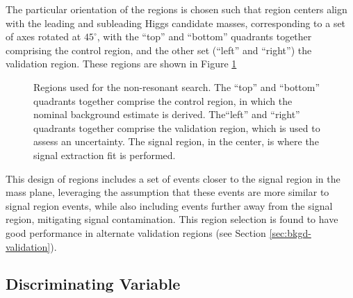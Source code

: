 The particular orientation of the regions is chosen such that region centers align with the leading
and subleading Higgs candidate masses, corresponding to a set of axes rotated at $45^{\circ}$, with the ``top''
and ``bottom'' quadrants together comprising the control region, and the other set (``left'' and ``right'')
the validation region. These regions are shown in Figure \ref{fig:nonres-regions}
\begin{figure}
\centering
{}
\caption{\label{fig:nonres-regions} Regions used for the non-resonant search. The ``top''
and ``bottom'' quadrants together comprise the control region, in which the nominal background 
estimate is derived. The``left'' and ``right'' quadrants together comprise the validation region, 
which is used to assess an uncertainty. The signal region, in the center, is where the signal extraction 
fit is performed.}
\end{figure}

This design of regions includes a set of events closer to the signal region in the mass plane, leveraging
the assumption that these events are more similar to signal region events, while also including events further away
from the signal region, mitigating signal contamination. This region selection is found to have good performance
in alternate validation regions (see Section \ref{sec:bkgd-validation}).

\subsection{Discriminating Variable}
\label{subsec:disc-var}


